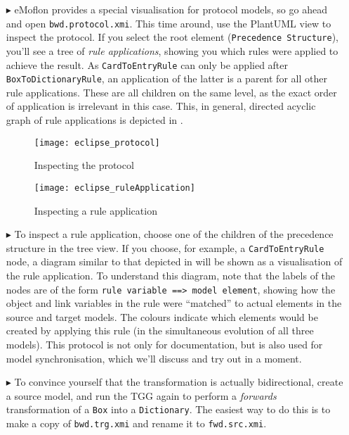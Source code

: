 \begin{itemize}
\item[$\blacktriangleright$] eMoflon provides a special visualisation for protocol models, so go ahead and open \texttt{bwd.protocol.xmi}.
This time around, use the PlantUML view to inspect the protocol.
If you select the root element (\texttt{Precedence Structure}), you'll see a tree of \emph{rule applications}, showing you which rules were applied to achieve the result.
As \texttt{Card\-To\-Entry\-Rule} can only be applied after \texttt{BoxToDictionaryRule}, an application of the latter is a parent for all other rule applications.
These are all children on the same level, as the exact order of application is irrelevant in this case.
This, in general, directed acyclic graph of rule applications is depicted in .
 
\begin{figure}[htb]
\begin{center}
  \texttt{[image: eclipse\_protocol]}
  \caption{Inspecting the protocol}
  \label{eclipse_protocol}
\end{center}
\end{figure}

\begin{figure}[htb]
\begin{center}
  \texttt{[image: eclipse\_ruleApplication]}
  \caption{Inspecting a rule application}
  \label{eclipse_ruleApplication}
\end{center}
\end{figure}

\item[$\blacktriangleright$] To inspect a rule application, choose one of the children of the precedence structure in the tree view.
If you choose, for example, a \texttt{Card\-To\-Entry\-Rule} node, a diagram similar to that depicted in  will be shown as a visualisation of the rule application.
To understand this diagram, note that the labels of the nodes are of the form \texttt{rule variable ==> model element}, showing how the object and link variables in the rule were ``matched'' to actual elements in the source and target models.
The colours indicate which elements would be created by applying this rule (in the simultaneous evolution of all three models).
This protocol is not only for documentation, but is also used for model synchronisation, which we'll discuss and try out in a moment.

\item[$\blacktriangleright$] To convince yourself that the transformation is actually bidirectional, create a source model, and run the TGG again to perform a \emph{forwards} transformation of a \texttt{Box} into a \texttt{Dictionary}.
The easiest way to do this is to make a copy of \texttt{bwd.trg.xmi} and rename
it to \texttt{fwd.src.xmi}.


\end{itemize}
